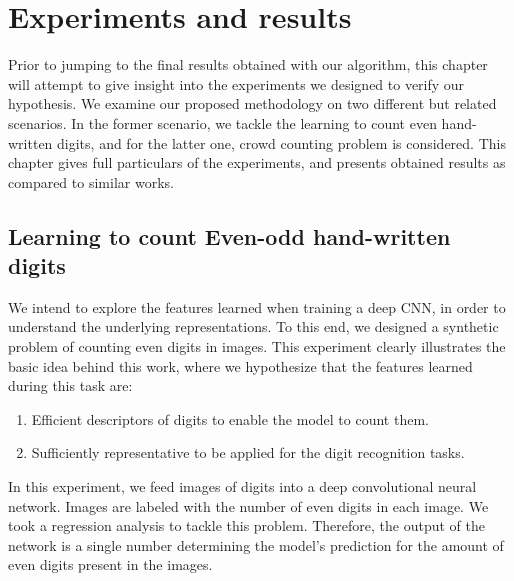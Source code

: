 \newpage
\chapter{Experiments and results}
\label{sec:experiments}

Prior to jumping to the final results obtained with our algorithm, this chapter will attempt to give insight into the experiments we designed to verify our hypothesis. We examine our proposed methodology on two different but related scenarios. In the former scenario, we tackle the learning to count even hand-written digits, and for the latter one, crowd counting problem is considered. This chapter gives full particulars of the experiments, and presents obtained results as compared to similar works.

\section{Learning to count Even-odd hand-written digits}

We intend to explore the features learned when training a deep CNN, in order to understand the underlying representations. To this end, we designed a synthetic problem of counting even digits in images. This experiment clearly illustrates the basic idea behind this work, where we hypothesize that the features learned during this task are:
\begin{enumerate}
\item Efficient descriptors of digits to enable the model to count them.
\item Sufficiently representative to be applied for the digit recognition tasks. 
\end{enumerate}

In this experiment, we feed images of digits into a deep convolutional neural network. Images are labeled with the number of even digits in each image. We took a regression analysis to tackle this problem. Therefore, the output of the network is a single number determining the model's prediction for the amount of even digits present in the images. 
 

